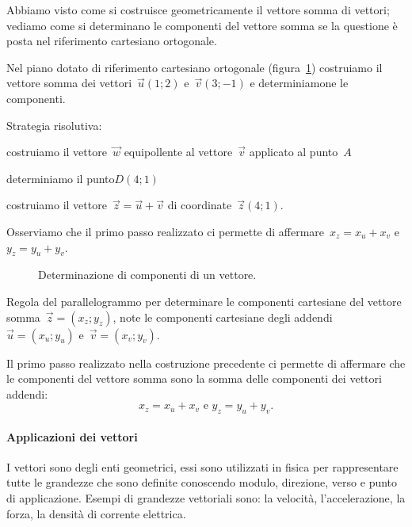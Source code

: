 Abbiamo visto come si costruisce geometricamente il vettore somma di vettori; 
vediamo come si determinano le componenti del vettore somma se la questione
è posta nel riferimento cartesiano ortogonale.

\begin{esempio}
Nel piano dotato di riferimento cartesiano ortogonale (figura~\ref{fig:F.10}) 
costruiamo il vettore somma dei vettori~$\vec{u}(1;2)$ e~$\vec{v}(3;-1)$ e 
determiniamone
le componenti.

Strategia risolutiva:
\begin{enumeratea}
\item costruiamo il vettore~$\vec{w}$ equipollente al vettore~$\vec{v}$ 
applicato al punto~$A$
\item determiniamo il punto$D(4;1)$
\item costruiamo il vettore~$\vec{z}=\vec{u}+\vec{v}$ di 
coordinate~$\vec{z}(4;1)$.
\end{enumeratea}
Osserviamo che il primo passo realizzato ci permette di affermare~$x_z=x_u+x_v$ 
e~$y_z=y_u+y_v$.
\end{esempio}

\newpage

\begin{inaccessibleblock}
 \begin{figure}[t]
\centering

\caption{Determinazione di componenti di un vettore.}\label{fig:F.10}
\end{figure}
\end{inaccessibleblock}

\begin{procedura} Regola del parallelogrammo per determinare le componenti 
cartesiane del vettore somma~$\vec{z}=(x_z;y_z)$,
note le componenti cartesiane degli addendi~$\vec{u}=(x_u;y_u)$ 
e~$\vec{v}=(x_v;y_v)$.

Il primo passo realizzato nella costruzione precedente ci permette di affermare 
che le componenti del vettore somma sono la somma
delle componenti dei vettori addendi:\[x_z=x_u+x_v\text{ e }y_z=y_u+y_v.\]
\end{procedura}


\paragraph{Applicazioni dei vettori}
I vettori sono degli enti geometrici, essi sono utilizzati in fisica per 
rappresentare tutte le grandezze che sono definite conoscendo modulo, direzione,
verso e punto di applicazione. Esempi di grandezze vettoriali sono: la 
velocità, l'accelerazione, la forza, la densità di corrente elettrica.

